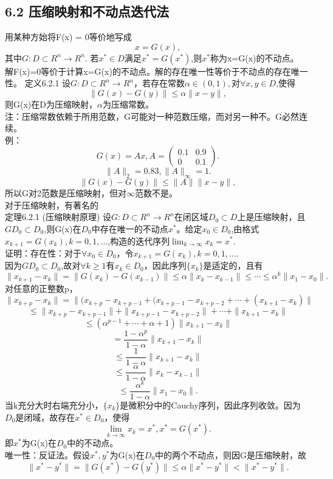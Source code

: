 \documentclass[a4paper,12pt]{article}
\begin{document}
\begin{CJK*}{UTF8}{gbsn}
	\section{6.2 压缩映射和不动点迭代法}
	用某种方始将F(x) = 0等价地写成
	$$x=G(x),$$
	其中$G:D\subset R^n \to R^n$.
	若$x^*\in D$满足$x^*=G(x^*)$,则$x^*$称为x=G(x)的不动点。\\
	解F(x)=0等价于计算x=G(x)的不动点。解的存在唯一性等价于不动点的存在唯一性。
	定义6.2.1 设$G:D\subset R^n \to R^n$，若存在常数$\alpha \in (0,1),$对$\forall x,y \in D$,使得
	$$\|G(x)-G(y)\|\leq \alpha\|x-y\|,$$
	则G(x)在D为压缩映射，$\alpha$为压缩常数。\\
	注：压缩常数依赖于所用范数，G可能对一种范数压缩，而对另一种不。G必然连续。\\
	例：
	$$G(x) = Ax, A=\left(\begin{array}{cc}0.1&0.9\\0&0.1
	\end{array}\right).$$
	$$ \|A\|_2=0.83,\|A\|_\infty=1.$$
	$$\|G(x)-G(y)\|\leq\|A\|\|x-y\|,$$
	所以G对2范数是压缩映射，但对$\infty$范数不是。\\
	对于压缩映射，有著名的\\
	定理6.2.1 (压缩映射原理) 设$G:D\subset R^n \to R^n$在闭区域$D_0\subset D$上是压缩映射，且$GD_0 \subset D_0$,则G(x)在$D_0$中存在唯一的不动点$x^*$。给定$x_0\in D_0$,由格式$x_{k+1}=G(x_k),k=0,1,\ldots$,构造的迭代序列$\lim_{k \to \infty}x_k = x^*$.\\
	证明：存在性：对于$\forall x_0 \in D_0$，令$x_{k+1}=G(x_k),k=0,1,\ldots$.\\
	因为$GD_0\subset D_0$,故对$\forall k \geq 1$有$x_k \in D_0$，因此序列$\{x_k\}$是适定的，且有
	$$\|x_{k+1}-x_k\|=\|G(x_k)-G(x_{k-1})\|\leq \alpha \|x_k - x_{k-1}\| \leq \cdots \leq \alpha^k\|x_1-x_0\|.$$
	对任意的正整数p，
	$$\|x_{k+p}-x_k\| = \|(x_{k+p} - x_{k+p-1}+(x_{k+p-1}-x_{k+p-2}+\cdots+(x_{k+1}-x_k)\| $$ 
	$$ \leq \|x_{k+p} - x_{k+p-1}\|+\|x_{k+p-1}-x_{k+p-2}\| + \cdots + \|x_{k+1}-x_k\| $$
	$$ \leq (\alpha^{p-1} + \cdots + \alpha +1)\|x_{k+1}-x_k\|$$
	$$ = \frac{1-\alpha^p}{1-\alpha}\|x_{k+1}-x_k\|$$
	$$\leq \frac{1}{1-\alpha}\|x_{k+1}-x_k\|$$
	$$\leq \frac{\alpha}{1-\alpha}\|x_k - x_{k-1}\|$$
	$$\leq \frac{\alpha^k}{1-\alpha}\|x_1-x_0\|.$$
	当k充分大时右端充分小，$\{x_k\}$是微积分中的Cauchy序列，因此序列收敛。因为$D_0$是闭域，故存在$x^*\in D_0$，使得
	$$\lim_{k\to \infty}x_k = x^*,x^*=G(x^*).$$
	即$x^*$为G(x)在$D_0$中的不动点。\\
	唯一性：反证法。假设$x^*,y^*$为G(x)在$D_0$中的两个不动点，则因G是压缩映射，故
	$$\|x^*-y^*\|=\|G(x^*)-G(y^*)\|\leq\alpha\|x^*-y^*\|<\|x^*-y^*\|.$$

\end{CJK*}
\end{document}

